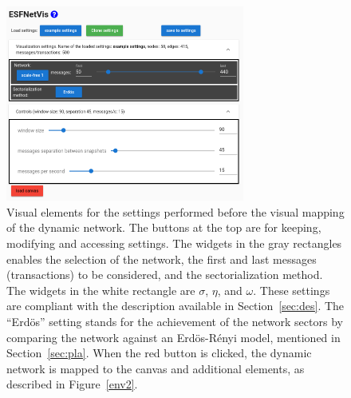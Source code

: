 \documentclass[runningheads]{llncs}
\begin{document}
\begin{figure}[!h]\centering
\includegraphics[width=0.7\textwidth]{esfNetVis___}
  \caption{Visual elements for the settings performed before
  the visual mapping of the dynamic network.
  The buttons at the top are for keeping, modifying and accessing settings.
  The widgets in the gray rectangles enables the selection of the network, the first and last messages (transactions) to be considered,
  and the sectorialization method.
  The widgets in the white rectangle are $\sigma$, $\eta$, and $\omega$.
  These settings are compliant with the description available in Section~\ref{sec:des}. The ``Erdös'' setting stands for the achievement of the network sectors by comparing the network against an Erdös-Rényi model, mentioned in Section~\ref{sec:pla}.
  When the red button is clicked, the dynamic network is mapped to the canvas and additional elements, as described in Figure~\ref{env2}.
  }\label{env1}
\end{figure}
\end{document}
